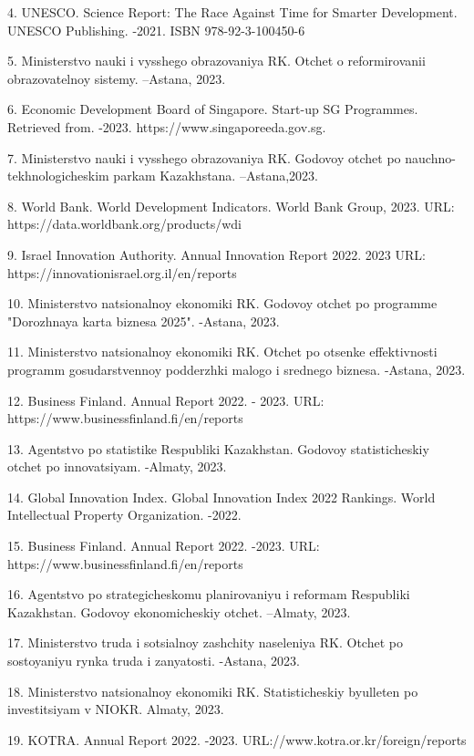 4. UNESCO. Science Report: The Race Against Time for Smarter
Development. UNESCO Publishing. -2021. ISBN 978-92-3-100450-6

5. Ministerstvo nauki i vysshego obrazovaniya RK. Otchet o
reformirovanii obrazovatel\textquotesingle noy sistemy. --Astana, 2023.

6. Economic Development Board of Singapore. Start-up SG Programmes.
Retrieved from. -2023. https://www.singaporeeda.gov.sg.

7. Ministerstvo nauki i vysshego obrazovaniya RK. Godovoy otchet po
nauchno-tekhnologicheskim parkam Kazakhstana. --Astana,2023.

8. World Bank. World Development Indicators. World Bank Group, 2023.
URL: https://data.worldbank.org/products/wdi

9. Israel Innovation Authority. Annual Innovation Report 2022. 2023 URL:
https://innovationisrael.org.il/en/reports

10. Ministerstvo natsional\textquotesingle noy ekonomiki RK. Godovoy
otchet po programme "Dorozhnaya karta biznesa 2025". -Astana, 2023.

11. Ministerstvo natsional\textquotesingle noy ekonomiki RK. Otchet po
otsenke effektivnosti programm gosudarstvennoy podderzhki malogo i
srednego biznesa. -Astana, 2023.

12. Business Finland. Annual Report 2022. - 2023. URL:
https://www.businessfinland.fi/en/reports

13. Agentstvo po statistike Respubliki Kazakhstan. Godovoy
statisticheskiy otchet po innovatsiyam. -Almaty, 2023.

14. Global Innovation Index. Global Innovation Index 2022 Rankings.
World Intellectual Property Organization. -2022.

15. Business Finland. Annual Report 2022. -2023. URL:
https://www.businessfinland.fi/en/reports

16. Agentstvo po strategicheskomu planirovaniyu i reformam Respubliki
Kazakhstan. Godovoy ekonomicheskiy otchet. --Almaty, 2023.

17. Ministerstvo truda i sotsial\textquotesingle noy zashchity
naseleniya RK. Otchet po sostoyaniyu rynka truda i zanyatosti. -Astana,
2023.

18. Ministerstvo natsional\textquotesingle noy ekonomiki RK.
Statisticheskiy byulleten\textquotesingle{} po investitsiyam v NIOKR.
Almaty, 2023.

19. KOTRA. Annual Report 2022. -2023.
URL://www.kotra.or.kr/foreign/reports

